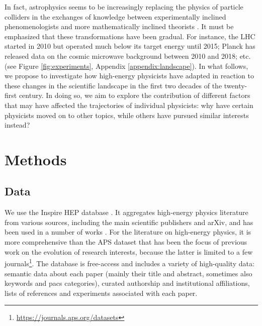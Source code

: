 \documentclass{article}
\begin{document}
In fact, astrophysics seems to be increasingly replacing the physics of particle colliders in the exchanges of knowledge between experimentally inclined phenomenologists and more mathematically inclined theorists \citep{Gautheron2023}. It must be emphasized that these transformations have been gradual. For instance, the LHC started in 2010 but operated much below its target energy until 2015; Planck has released data on the cosmic microwave background between 2010 and 2018; etc. (see Figure \ref{fig:experiments}, Appendix \ref{appendix:landscape}). In what follows, we propose to investigate how high-energy physicists have adapted in reaction to these changes in the scientific landscape in the first two decades of the twenty-first century. In doing so, we aim to explore the contribution of different factors that may have affected the trajectories of individual physicists: why have certain physicists moved on to other topics, while others have pursued similar interests instead? 


\section{\label{sec:methods}Methods}

\subsection{\label{sec:data}Data}

We use the Inspire HEP database \citep{InspireAPI}. It aggregates high-energy physics literature from various sources, including the main scientific publishers and arXiv, and has been used in a number of works \citep{Perovi2016,Chall2019a,Strumia2021,Sikimi2022,Gautheron2023}. For the literature on high-energy physics, it is more comprehensive than the APS dataset that has been the focus of previous work on the evolution of research interests, because the latter is limited to a few journals\footnote{\url{https://journals.aps.org/datasets}}. The database is free-access and includes a variety of high-quality data: semantic data about each paper (mainly their title and abstract, sometimes also keywords and \gls{pacs} categories), curated authorship and institutional affiliations, lists of references and experiments associated with each paper. %
\end{document}
